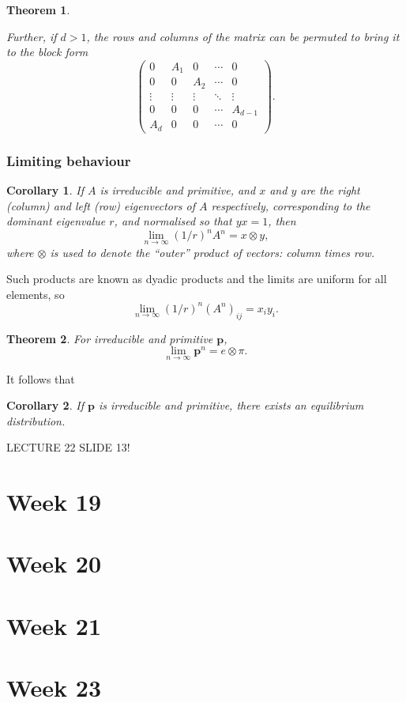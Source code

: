 \documentclass{article}
\newtheorem{theorem}{Theorem}
\newtheorem{corollary}{Corollary}
\begin{document}
\begin{theorem}
\begin{enumerate}
        Further, if $d>1$, the rows and columns of the matrix can be permuted to bring it to the block form
        \begin{equation}
            \begin{pmatrix}
                0 & A_1 & 0 & \cdots & 0 \\
                0 & 0 & A_2 & \cdots & 0 \\
                \vdots & \vdots & \vdots & \ddots & \vdots \\
                0 & 0 & 0 & \cdots & A_{d-1} \\
                A_d & 0 & 0 & \cdots & 0
            \end{pmatrix}. \nonumber
        \end{equation}
    \end{enumerate}
\end{theorem}

\subsubsection{Limiting behaviour}
\begin{corollary}
    If $A$ is irreducible and primitive, and $x$ and $y$ are the right (column) and left (row) eigenvectors of $A$ respectively, corresponding to the dominant eigenvalue $r$, and normalised so that $yx=1$, then
    \begin{equation}
        \lim_{n\to\infty}(1/r)^n A^n = x \otimes y,
    \end{equation}
    where $\otimes$ is used to denote the ``outer'' product of vectors: column times row.
\end{corollary}
Such products are known as dyadic products and the limits are uniform for all elements, so 
\begin{equation}
    \lim_{n\to\infty}(1/r)^n(A^n)_{ij} =x_i y_i. \nonumber
\end{equation}
\begin{theorem}
    For irreducible and primitive $\mathbf{p}$,
    \begin{equation}
        \lim_{n\to\infty}\mathbf{p}^n = e\otimes \pi. 
    \end{equation}
\end{theorem}
It follows that
\begin{corollary}
    If $\mathbf{p}$ is irreducible and primitive, there exists an equilibrium distribution.
\end{corollary}
LECTURE 22 SLIDE 13!


\section{Week 19}

\section{Week 20}

\section{Week 21}

\section{Week 23}
\end{document}
